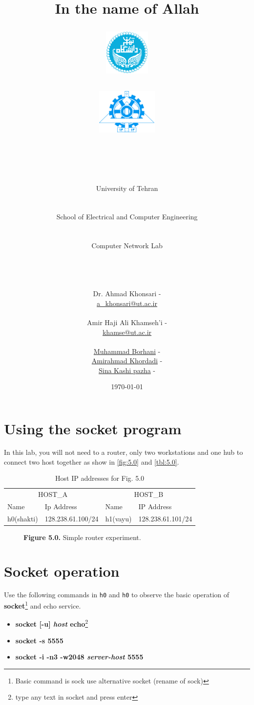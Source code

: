 \documentclass[10pt,a4paper]{article}
\title{
\normalsize In the name of Allah\\
\vspace{10pt}
\LARGE\FR{بسم \allah\  الرحمن الرحیم}
\vspace{10pt}
\begin{center}
	\begin{minipage}{0.48\textwidth} \begin{flushleft}
			\includegraphics[height=64pt,width=64pt]{../img/logo.png}
	\end{flushleft}\end{minipage}
	\begin{minipage}{0.48\textwidth} \begin{flushright}
			\includegraphics[height=64pt]{../img/eng-logo.png}
	\end{flushright}\end{minipage}
\end{center}
\vspace*{-64pt}
	\huge \titleText\\
\vspace{40pt}
}
\author{
	\huge University of Tehran\\
    \LARGE \FR{دانشگاه تهران}\\\\
    \LARGE School of Electrical and Computer Engineering\\
    \FR{دانشکده مهندسی برق و کامپیوتر}\\\\
    \Large Computer Network Lab\\
    \FR{آزمایشگاه شبکه‌های کامپیوتری}\\\\\\\\
    \normalfont
    Dr. Ahmad Khonsari - \FR{احمد خونساری}\\
    \href{mailto:a_khonsari@ut.ac.ir}{a\_khonsari@ut.ac.ir}\\\\
    \normalsize
    Amir Haji Ali Khamseh'i - \FR{امیر حاجی علی خمسه‌ء}\\
    \href{mailto:khamse@ut.ac.ir}{khamse@ut.ac.ir}\\\\
    \normalsize \href{mailto:m.borhani@ut.ac.ir}{Muhammad Borhani} - \FR{محمد برهانی}\\
	\normalsize \href{mailto:a.a.khordadi@ut.ac.ir}{Amirahmad Khordadi} - \FR{امیر احمد خردادی}\\
	\normalsize \href{mailto:sina\_kashipazha@ut.ac.ir}{Sina Kashi pazha} - \FR{سینا کاشی پزها}\\
}
\date{\vspace{30pt}\today\\\vspace{10pt}{\selectlanguage{farsi}\today}}
\numberwithin{equation}{section}
\numberwithin{figure}{section}
\numberwithin{table}{section}
\begin{document}

\maketitle


\pagebreak
\section*{Using the socket program}
\label{sec:schema}
	In this lab, you will not need to a router, only two workstations and one hub to connect two host together as show in \autoref{fig:5.0} and \autoref{tbl:5.0}.
	\begin{table}[H]
		\caption{Host IP addresses for Fig. 5.0}
		\label{tbl:5.0}
        \vspace{5pt}
        \centering
        \large
        \begin{tabular}{ *4l }
            \hline \hline
            \multicolumn{2}{c}{HOST\_A} & \multicolumn{2}{c}{HOST\_B} \\
            Name & Ip Address & Name & IP Address \\
            \hline 
            h0(shakti) & 128.238.61.100/24 & h1(vayu) & 128.238.61.101/24\\
            \hline \hline
            \end{tabular}
    \end{table}

    \begin{figure}[H]
        \centering
		\caption{\textbf{Figure 5.0.} Simple router experiment.}        
		\label{fig:5.0}
    \end{figure}

\section{Socket operation}
	Use the following commands in \texttt{h0} and \texttt{h0} to observe the basic operation of \textbf{socket}\footnote{Basic command is sock use alternative socket (rename of sock)} and echo service.
	\begin{itemize}
		\item \textbf{socket [-u] \textit{host} echo}\footnote{type any text in socket and press enter}
		\item \textbf{socket -s 5555}
		\item \textbf{socket -i -n3 -w2048 \textit{server-host} 5555}
	\end{itemize}
\end{document}
